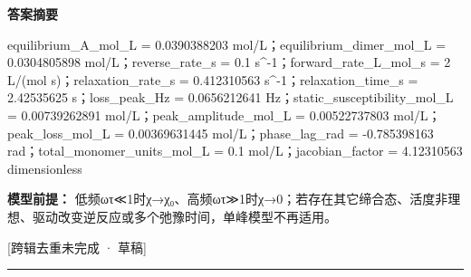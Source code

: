\documentclass[UTF8,11pt,a4paper]{ctexart}
\begin{document}
\noindent\textbf{答案摘要}\par
equilibrium\_A\_mol\_L = 0.0390388203 mol/L；equilibrium\_dimer\_mol\_L = 0.0304805898 mol/L；reverse\_rate\_s = 0.1 s\textasciicircum{}-1；forward\_rate\_L\_mol\_s = 2 L/(mol s)；relaxation\_rate\_s = 0.412310563 s\textasciicircum{}-1；relaxation\_time\_s = 2.42535625 s；loss\_peak\_Hz = 0.0656212641 Hz；static\_susceptibility\_mol\_L = 0.00739262891 mol/L；peak\_amplitude\_mol\_L = 0.00522737803 mol/L；peak\_loss\_mol\_L = 0.00369631445 mol/L；phase\_lag\_rad = -0.785398163 rad；total\_monomer\_units\_mol\_L = 0.1 mol/L；jacobian\_factor = 4.12310563 dimensionless\par
\noindent\textbf{模型前提：}
低频ωτ≪1时χ→χ₀、高频ωτ≫1时χ→0；若存在其它缔合态、活度非理想、驱动改变逆反应或多个弛豫时间，单峰模型不再适用。\par
\noindent\textcolor{red!65!black}{[跨辑去重未完成 · 草稿]} \par
\medskip\hrule\medskip
{}
\end{document}
